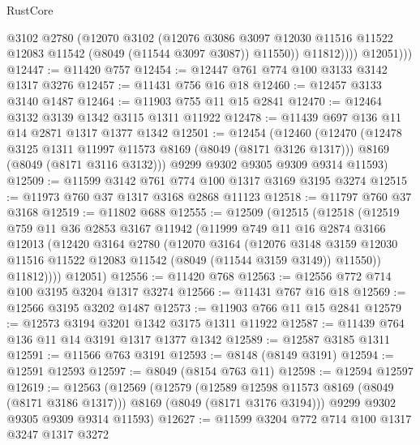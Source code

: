 \begin{lexlean}{RustCore}
\begin{coremodule}
                  @3102
                  @2780
                  (@12070
                    @3102
                    (@12076
                      @3086
                      @3097
                      @12030
                      @11516
                      @11522
                      @12083
                      @11542
                      (@8049 (@11544 @3097 @3087))
                      @11550))
                  @11812))))
          @12051)))
@12447 := @11420 @757
@12454 := @12447 @761 @774 @100 @3133 @3142 @1317 @3276
@12457 := @11431 @756 @16 @18
@12460 := @12457 @3133 @3140 @1487
@12464 := @11903 @755 @11 @15 @2841
@12470 := @12464 @3132 @3139 @1342 @3115 @1311 @11922
@12478 := @11439 @697 @136 @11 @14 @2871 @1317 @1377 @1342
@12501 := @12454
    (@12460
      (@12470
        (@12478 @3125 @1311 @11997 @11573 @8169 (@8049 (@8171 @3126 @1317)))
        @8169
        (@8049 (@8171 @3116 @3132)))
      @9299
      @9302
      @9305
      @9309
      @9314
      @11593)
@12509 := @11599 @3142 @761 @774 @100 @1317 @3169 @3195 @3274
@12515 := @11973 @760 @37 @1317 @3168 @2868 @11123
@12518 := @11797 @760 @37 @3168
@12519 := @11802 @688
@12555 := @12509
    (@12515
      (@12518
        (@12519
          @759
          @11
          @36
          @2853
          @3167
          @11942
          (@11999
            @749
            @11
            @16
            @2874
            @3166
            @12013
            (@12420
              @3164
              @2780
              (@12070
                @3164
                (@12076
                  @3148
                  @3159
                  @12030
                  @11516
                  @11522
                  @12083
                  @11542
                  (@8049 (@11544 @3159 @3149))
                  @11550))
              @11812))))
      @12051)
@12556 := @11420 @768
@12563 := @12556 @772 @714 @100 @3195 @3204 @1317 @3274
@12566 := @11431 @767 @16 @18
@12569 := @12566 @3195 @3202 @1487
@12573 := @11903 @766 @11 @15 @2841
@12579 := @12573 @3194 @3201 @1342 @3175 @1311 @11922
@12587 := @11439 @764 @136 @11 @14 @3191 @1317 @1377 @1342
@12589 := @12587 @3185 @1311
@12591 := @11566 @763 @3191
@12593 := @8148 (@8149 @3191)
@12594 := @12591 @12593
@12597 := @8049 (@8154 @763 @11)
@12598 := @12594 @12597
@12619 := @12563
    (@12569
      (@12579
        (@12589 @12598 @11573 @8169 (@8049 (@8171 @3186 @1317)))
        @8169
        (@8049 (@8171 @3176 @3194)))
      @9299
      @9302
      @9305
      @9309
      @9314
      @11593)
@12627 := @11599 @3204 @772 @714 @100 @1317 @3247 @1317 @3272

\end{coremodule}
\end{lexlean}
